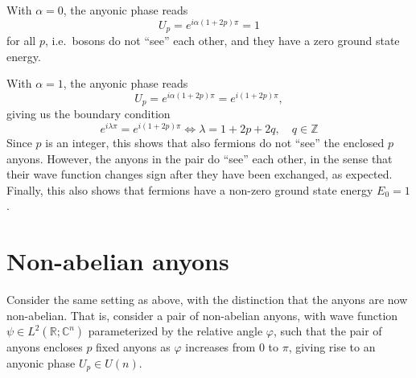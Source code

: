 \begin{corollary}
  With $α = 0$, the anyonic phase reads
  \begin{equation}
    U_p = e^{iα(1+2p)π} = 1
  \end{equation}
  for all $p$, i.e.\ bosons do not ``see'' each other, and they have a zero ground state energy.

  With $α = 1$, the anyonic phase reads
  \begin{equation}
    U_p = e^{iα(1+2p)π} = e^{i(1+2p)π},
  \end{equation}
  giving us the boundary condition
  \begin{equation}
    e^{iλ π} = e^{i(1+2p)π} \iff λ = 1 + 2p + 2q, \quad q ∈ ℤ
  \end{equation}
  Since $p$ is an integer, this shows that also fermions do not ``see'' the enclosed $p$ anyons.
  However, the anyons in the pair do ``see'' each other, in the sense that their wave function changes sign after they have been exchanged, as expected. Finally, this also shows that fermions have a non-zero ground state energy $E_0 = 1$.
\end{corollary}












\section{Non-abelian anyons}

Consider the same setting as above, with the distinction that the anyons are now non-abelian. That is, consider a pair of non-abelian anyons, with wave function $ψ ∈ L^2(ℝ; \mathbb{C}^n)$ parameterized by the relative angle $\varphi$, such that the pair of anyons encloses $p$ fixed anyons as $\varphi$ increases from $0$ to $π$, giving rise to an anyonic phase $U_p ∈ U(n)$.





